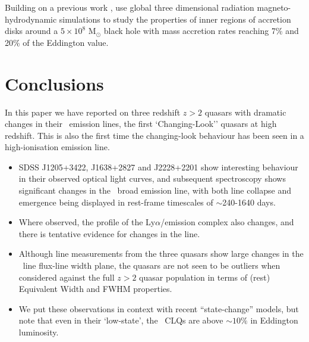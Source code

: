 \documentclass[fleqn,usenatbib]{mnras}
\begin{document}
Building on a previous work \citep[e.g.,][]{JiangYF2014, JiangYF2016, JiangYF2019}, \citet{JiangYF2019arXiv} use global three dimensional radiation magneto-hydrodynamic simulations to study the properties of inner regions of accretion disks around a $5 \times 10^{8}$ M$_{\odot}$ black hole with mass accretion rates reaching 7\% and 20\% of the Eddington value.




\section{Conclusions}
In this paper we have reported on three redshift $z>2$ quasars with
dramatic changes in their \civ\ emission lines, the first
`Changing-Look'' quasars at high redshift.  This is also the first
time the changing-look behaviour has been seen in a high-ionisation
emission line.

\begin{itemize}
\item SDSS J1205+3422, J1638+2827 and J2228+2201 show interesting behaviour
  in their observed optical light curves, and subsequent spectroscopy
  shows significant changes in the \civ\ broad emission line, with both
  line collapse and emergence being displayed in rest-frame timescales
  of $\sim$240-1640 days.
\item Where observed, the profile of the Ly$\alpha$/\nv emission complex
  also changes, and there is tentative evidence for changes in the \mgii
  line.
\item Although line measurements from the three quasars show large changes
  in the \civ\ line flux-line width plane, the quasars are not seen to
  be outliers when considered against the full $z>2$ quasar population
  in terms of (rest) Equivalent Width and FWHM properties.
\item 
  We put these observations in context with recent ``state-change''
  models, but note that even in their `low-state', the \civ\ CLQs are
  above $\sim10\%$ in Eddington luminosity.
\end{itemize}
\end{document}
